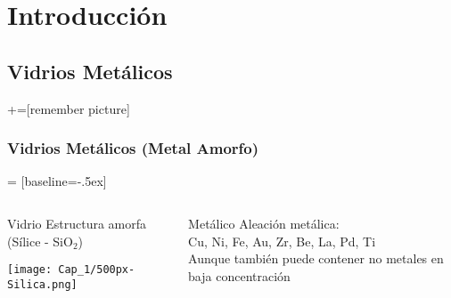 
\section[Introducci\'on]{Introducci\'on}
\subsection{Vidrios Met\'alicos}

+=[remember picture]

\begin{frame}
\frametitle{Vidrios Met\'alicos (Metal Amorfo)}

 = [baseline=-.5ex]

\centering
{} 

\vspace{0.2cm}

\begin{columns}
  \begin{column}{0.48\paperwidth}
    \centering
    \begin{block}{Vidrio}
      \centering Estructura amorfa (\scriptsize{Sílice - SiO$_{2}$}\normalsize{)}
      
      \vspace{0.2cm}
      \texttt{[image: Cap\_1/500px-Silica.png]}
    \end{block}
  \end{column}
  \begin{column}{0.48\paperwidth}
    \centering
    \begin{block}{Met\'alico}
      \centering Aleaci\'on met\'alica:\\
      Cu, Ni, Fe, Au, Zr, Be, La, Pd, Ti\\
      
      \vspace{0.2cm}
      Aunque tambi\'en puede contener no metales en baja concentraci\'on
    \end{block}
  \end{column}
\end{columns}


\end{frame}

